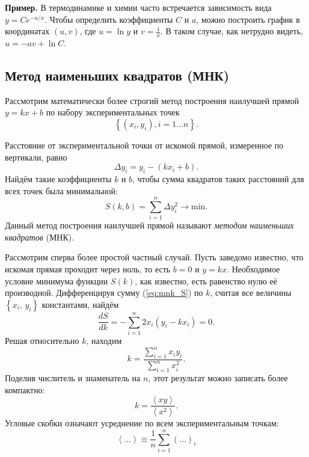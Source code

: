 \documentclass[10pt]{article}
\begin{document}
\textbf{\footnotesize{}Пример.}{\footnotesize{} В термодинамике и
химии часто встречается зависимость вида $y=Ce^{-a/x}$. Чтобы определить
коэффициенты $C$ и $a$, можно построить график в координатах $(u,v)$,
где $u=\ln y$ и $v=\frac{1}{x}$. В таком случае, как нетрудно видеть,
$u=-av+\ln C$.}{\footnotesize\par}

\subsection{Метод наименьших квадратов (МНК)\label{subsec:MNK}}

Рассмотрим математически более строгий метод построения наилучшей
прямой $y=kx+b$ по набору экспериментальных точек 
\[
\left\{ \left(x_{i},y_{i}\right),i=1\ldots n\right\} .
\]

Расстояние от экспериментальной точки от искомой прямой, измеренное
по вертикали, равно
\[
\Delta y_{i}=y_{i}-\left(kx_{i}+b\right).
\]
Найдём такие коэффициенты $k$ и $b$, чтобы сумма квадратов таких
расстояний для всех точек была минимальной:
\begin{equation}
S\!\left(k,b\right)=\sum\limits _{i=1}^{n}\Delta y_{i}^{2}\to\mathrm{min}.\label{eq:mnk_S}
\end{equation}
Данный метод построения наилучшей прямой называют \emph{методом наименьших
квадратов} (МНК).

Рассмотрим сперва более простой частный случай. Пусть заведомо известно,
что искомая прямая проходит через ноль, то есть $b=0$ и $y=kx$.
Необходимое условие минимума функции $S\left(k\right)$, как известно,
есть равенство нулю её производной. Дифференцируя сумму (\ref{eq:mnk_S})
по $k$, считая все величины $\left\{ x_{i},\,y_{i}\right\} $ константами,
найдём 
\[
\frac{dS}{dk}=-\sum\limits _{i=1}^{n}2x_{i}\left(y_{i}-kx_{i}\right)=0.
\]
Решая относительно $k$, находим 
\[
k=\frac{\sum\limits _{i=1}^{n}x_{i}y_{i}}{\sum\limits _{i=1}^{n}x_{i}^{2}}.
\]
Поделив числитель и знаменатель на $n$, этот результат можно записать
более компактно:
\begin{equation}
\boxed{k=\frac{\left\langle xy\right\rangle }{\left\langle x^{2}\right\rangle }}.\label{eq:MNK0}
\end{equation}
Угловые скобки означают усреднение по всем экспериментальным точкам:
\[
\left\langle \ldots\right\rangle \equiv\frac{1}{n}\sum\limits _{i=1}^{n}\left(\ldots\right)_{i}
\]
\end{document}
